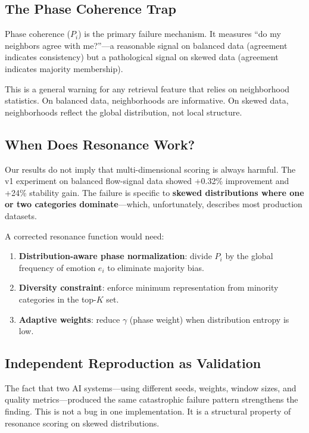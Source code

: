 \documentclass[11pt,a4paper]{article}
\begin{document}
\subsection{The Phase Coherence Trap}

Phase coherence ($P_i$) is the primary failure mechanism. It measures ``do my neighbors agree with me?''---a reasonable signal on balanced data (agreement indicates consistency) but a pathological signal on skewed data (agreement indicates majority membership).

This is a general warning for any retrieval feature that relies on neighborhood statistics. On balanced data, neighborhoods are informative. On skewed data, neighborhoods reflect the global distribution, not local structure.

\subsection{When Does Resonance Work?}

Our results do not imply that multi-dimensional scoring is always harmful. The v1 experiment on balanced flow-signal data showed +0.32\% improvement and +24\% stability gain. The failure is specific to \textbf{skewed distributions where one or two categories dominate}---which, unfortunately, describes most production datasets.

A corrected resonance function would need:
\begin{enumerate}[itemsep=2pt]
  \item \textbf{Distribution-aware phase normalization}: divide $P_i$ by the global frequency of emotion $e_i$ to eliminate majority bias.
  \item \textbf{Diversity constraint}: enforce minimum representation from minority categories in the top-$K$ set.
  \item \textbf{Adaptive weights}: reduce $\gamma$ (phase weight) when distribution entropy is low.
\end{enumerate}

\subsection{Independent Reproduction as Validation}

The fact that two AI systems---using different seeds, weights, window sizes, and quality metrics---produced the same catastrophic failure pattern strengthens the finding. This is not a bug in one implementation. It is a structural property of resonance scoring on skewed distributions.
\end{document}
